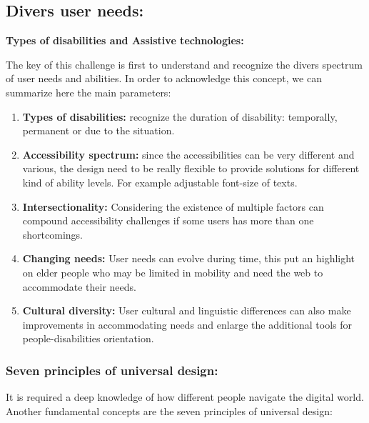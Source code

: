 \documentclass[11pt,a4paper]{article}
\begin{document}
		 

\subsection{Divers user needs:}

	\textbf{\large Types of disabilities and Assistive technologies:}

	The key of this challenge is first to understand and recognize the divers spectrum of user needs and abilities. In order to 
	acknowledge this concept, we can summarize here the main parameters:
	
	\begin{enumerate}
		\item  \textbf{Types of disabilities:} recognize the duration of disability: temporally, permanent or due to the situation.
		\item \textbf{Accessibility spectrum:} since the accessibilities can be very different and various, the design need to be really 
		flexible to provide solutions for different kind of ability levels. For example adjustable font-size of texts.
		\item \textbf{Intersectionality:} Considering the existence of multiple factors can compound accessibility challenges if some users has more than one shortcomings.
		\item \textbf{Changing needs:} User needs can evolve during time, this put an highlight on elder people who may be limited 
		in mobility and need the web to accommodate their needs.
		\item \textbf{Cultural diversity:} User cultural and linguistic differences can also make improvements in accommodating
		 needs and enlarge the additional tools for people-disabilities orientation. 
	\end{enumerate} 	
	
	\subsubsection*{\textbf{\Large Seven principles of universal design:}}
	It is required a deep knowledge of how different people navigate the digital world.
	Another fundamental concepts are the seven principles of universal design:
	
\end{document}
